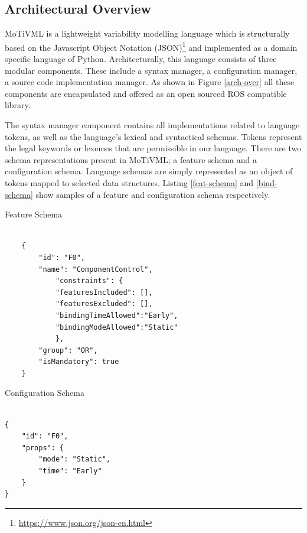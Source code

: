 \documentclass[conference]{IEEEtran}
\newcommand{\foot}[1]{\footnote{\url{#1}}}
\begin{document}
\subsection{Architectural Overview}
MoTiVML is a lightweight variability modelling language which is structurally based on the Javascript Object Notation (JSON)\foot{https://www.json.org/json-en.html} and implemented as a domain specific language of Python. Architecturally, this language consists of three modular components. These include a syntax manager, a configuration manager, a source code implementation manager. As shown in Figure \ref{arch-over} all these components are encapsulated and offered as an open sourced ROS compatible library.

The syntax manager component contains all implementations related to language tokens, as well as the language's lexical and syntactical schemas. Tokens represent the legal keywords or lexemes that are permissible in our language. There are two schema representations present in MoTiVML; a feature schema and a configuration schema. Language schemas are simply represented as an object of tokens mapped to selected data structures. Listing \ref{feat-schema} and \ref{bind-schema} show samples of a feature and configuration schema respectively.

\begin{listing}
\caption{Feature Schema}
\begin{verbatim}

    {
        "id": "F0",
        "name": "ComponentControl",
            "constraints": {
            "featuresIncluded": [],
            "featuresExcluded": [],
            "bindingTimeAllowed":"Early",
            "bindingModeAllowed":"Static"
            },
        "group": "OR",
        "isMandatory": true
    }

\end{verbatim}
\label{feat-schema}
\end{listing}

\begin{listing}
\caption{Configuration Schema}
\begin{verbatim}

{
    "id": "F0",
    "props": {
        "mode": "Static",
        "time": "Early"
    }
}
\end{verbatim}
\label{bind-schema}
\end{listing}
\end{document}
